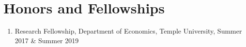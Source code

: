 \documentclass[12pt,letterpaper]{article}
\begin{document}
\section*{Honors and Fellowships}
\begin{enumerate}
  \item Research Fellowship, Department of Economics, Temple University, Summer 2017 \& Summer 2019
\end{enumerate}
%	
%	
%	
%
%
%		
\end{document}
